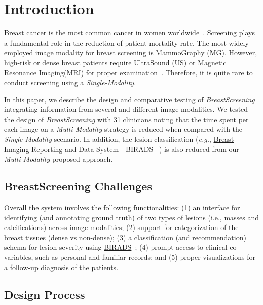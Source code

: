 \section{Introduction}
\label{sec:sec001}

Breast cancer is the most common cancer in women worldwide~\cite{henriksen2018efficacy}.
Screening plays a fundamental role in the reduction of patient mortality rate.
The most widely employed image modality for breast screening is MammoGraphy (MG).
However, high-risk or dense breast patients require UltraSound (US) or Magnetic Resonance Imaging\footnotemark[1] (MRI) for proper examination~\cite{Maicas2019}.
Therefore, it is quite rare to conduct screening using a \textit{Single-Modality}.

In this paper, we describe the design and comparative testing of \hyperlink{https://breastscreening.github.io/}{{\it BreastScreening}} integrating information from several and different image modalities.
We tested the design of \hyperlink{https://breastscreening.github.io/}{{\it BreastScreening}} with 31 clinicians noting that the time spent per each image on a \textit{Multi-Modality} strategy is reduced when compared with the \textit{Single-Modality} scenario.
In addition, the lesion classification ({\em e.g.}, \hyperlink{https://breast-cancer.ca/bi-rads/}{Breast Imaging Reporting and Data System - BIRADS} ~\cite{SPAK2017179}) is also reduced from our \textit{Multi-Modality} proposed approach.

\subsection{BreastScreening Challenges}

Overall the system involves the  following functionalities:
(1) an interface for identifying (and annotating ground truth) of two types of lesions (i.e., masses and calcifications) across image modalities;
(2) support for categorization of the breast tissues (dense vs non-dense);
(3) a classification (and recommendation) schema for lesion severity using \hyperlink{https://breast-cancer.ca/bi-rads/}{BIRADS}~\cite{aghaei2018association, SPAK2017179};
(4) prompt access to clinical co-variables, such as personal and familiar records; and
(5) proper visualizations for a follow-up diagnosis of the patients.

\subsection{Design Process}

